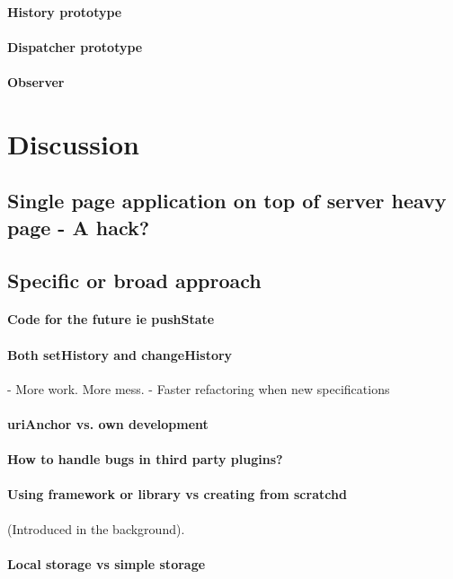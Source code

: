 \documentclass[english]{ifimaster}
\begin{document}
\subsubsection{History prototype}
\subsubsection{Dispatcher prototype}
\subsubsection{Observer}



\chapter{Discussion}
\section{Single page application on top of server heavy page - A hack?}
\section{Specific or broad approach}
\subsubsection{Code for the future ie pushState} {}
\subsubsection{Both setHistory and changeHistory} {}
 - More work. More mess.
 - Faster refactoring when new specifications
\subsubsection{uriAnchor vs. own development} 
\subsubsection{How to handle bugs in third party plugins?} 
\subsubsection{Using framework or library vs creating from scratchd}  (Introduced in the background).
\subsubsection{Local storage vs simple storage} 
\end{document}
